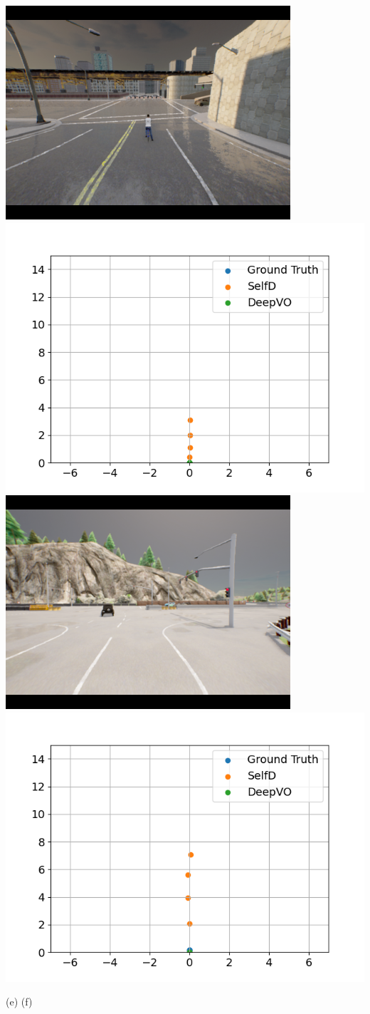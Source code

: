 \documentclass[12pt, letterpaper,cleardoubleempty,BCOR1cm]{scrbook}
\begin{document}
{\begin{minipage}{\textwidth}
\begin{center}
\includegraphics[trim={1.5cm 0.75cm 1.5cm 0.75cm},clip,height=0.19\textwidth]{./img/compare/12.png}
\includegraphics[trim={1cm 0.5cm 1.5cm 1cm},clip,height=0.19\textwidth]{./img/compare/12_wp.png}
\hfill
\includegraphics[trim={1.5cm 0.75cm 1.5cm 0.75cm},clip,height=0.19\textwidth]{./img/compare/11.png}
\includegraphics[trim={1cm 0.5cm 1.5cm 1cm},clip,height=0.19\textwidth]{./img/compare/11_wp.png}

\hspace{0.19\textwidth} (e) \hfill (f) \hspace{0.19\textwidth}
\vspace{5pt}


\end{center}
\end{minipage}}
\end{document}
